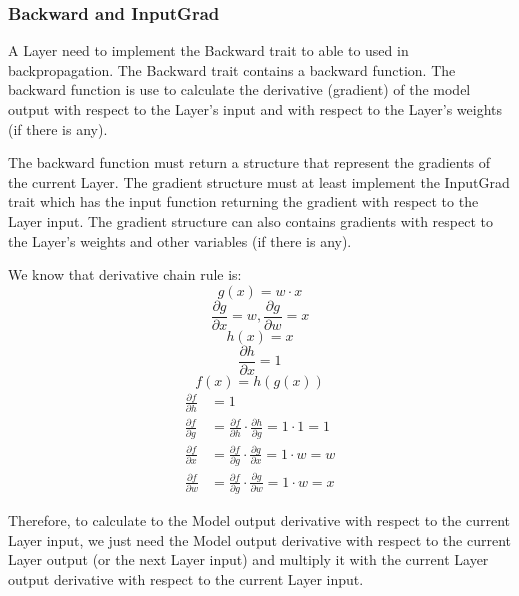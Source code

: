 \documentclass[conference]{IEEEtran}
\begin{document}
\subsubsection{Backward and InputGrad} 
A Layer need to implement the Backward trait to able to used in backpropagation. The Backward trait contains a backward function. The backward function is use to calculate the derivative (gradient) of the model output with respect to the Layer's input and with respect to the Layer's weights (if there is any). 

The backward function must return a structure that represent the gradients of the current Layer. The gradient structure must at least implement the InputGrad trait which has the input function returning the gradient with respect to the Layer input. The gradient structure can also contains gradients with respect to the Layer's weights and other variables (if there is any).

We know that derivative chain rule is:
\begin{equation}
g(x) = w \cdot x
\label{g}
\end{equation}
\begin{equation}
\frac{\partial g}{\partial x} = w, 
\frac{\partial g}{\partial w} = x
\label{g-prime}
\end{equation}
\begin{equation}
h(x) = x
\label{h}
\end{equation}
\begin{equation}
\frac{\partial h}{\partial x} = 1
\label{h-prime}
\end{equation}
\begin{equation}
f(x) = h(g(x))
\label{f}
\end{equation}
\begin{equation}
\begin{split}
\frac{\partial f}{\partial h} &= 1 \\
\frac{\partial f}{\partial g} &= \frac{\partial f}{\partial h} \cdot \frac{\partial h}{\partial g} = 1 \cdot 1 = 1 \\
\frac{\partial f}{\partial x} &= \frac{\partial f}{\partial g} \cdot \frac{\partial g}{\partial x} = 1 \cdot w = w \\
\frac{\partial f}{\partial w} &= \frac{\partial f}{\partial g} \cdot \frac{\partial g}{\partial w} = 1 \cdot w = x
\end{split}
\label{chain-rule}
\end{equation}

Therefore, to calculate to the Model output derivative with respect to the current Layer input, we just need the Model output derivative with respect to the current Layer output (or the next Layer input) and multiply it with the current Layer output derivative with respect to the current Layer input.
\end{document}
